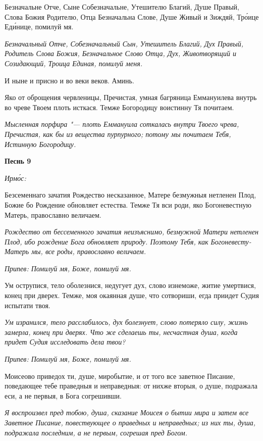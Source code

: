 Безначальне Отче, Сыне Собезначальне, Утешителю Благий, Душе Правый, Слова Божия Родителю, Отца Безначальна Слове, Душе Живый и Зиждяй, Тро́ице Еди́нице, помилуй мя.


\itshape Безначальный Отче, Собезначальный Сын, Утешитель Благий, Дух Правый, Родитель Слова Божия, Безначальное Слово Отца, Дух, Животворящий и Созидающий, Троица Единая, помилуй меня.\normalfont{}


И ныне и присно и во веки веков. Аминь.


Яко от оброщения червленицы, Пречистая, умная багряница Еммануилева внутрь во чреве Твоем плоть исткася. Темже Богородицу воистинну Тя почитаем.


\itshape Мысленная порфира "--- плоть Еммануила соткалась внутри Твоего чрева, Пречистая, как бы из вещества пурпурного; потому мы почитаем Тебя, Истинную Богородицу.\normalfont{}





\bfseries Песнь 9\normalfont{}


\itshape Ирмо́с:\normalfont{}


Безсеменнаго зачатия Рождество несказанное, Матере безмужныя нетленен Плод, Божие бо Рождение обновляет естества. Темже Тя вси роди, яко Богоневестную Матерь, православно величаем.


\itshape Рождество от бессеменного зачатия неизъяснимо, безмужной Матери нетленен Плод, ибо рождение Бога обновляет природу. Поэтому Тебя, как Богоневесту-Матерь мы, все роды, православно величаем.\normalfont{}


\itshape Припев:\normalfont{} Помилуй мя, Боже, помилуй мя.


Ум острупися, тело оболезнися, недугует дух, слово изнеможе, житие умертвися, конец при дверех. Темже, моя окаянная душе, что сотвориши, егда приидет Судия испытати твоя.


\itshape Ум изранился, тело расслабилось, дух болезнует, слово потеряло силу, жизнь замерла, конец при дверях. Что же сделаешь ты, несчастная душа, когда придет Судия исследовать дела твои?\normalfont{}


\itshape Припев:\normalfont{} Помилуй мя, Боже, помилуй мя.


Моисеово приведох ти, душе, миробытие, и от того все заветное Писание, поведающее тебе праведныя и неправедныя: от нихже вторыя, о душе, подражала еси, а не первыя, в Бога согрешивши.


\itshape Я воспроизвел пред тобою, душа, сказание Моисея о бытии мира и затем все Заветное Писание, повествующее о праведных и неправедных; из них ты, душа, подражала последним, а не первым, согрешая пред Богом.\normalfont{}


